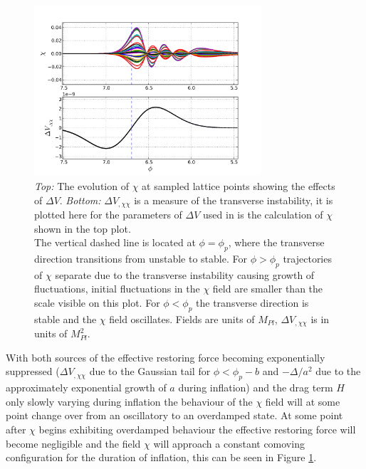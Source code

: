 \documentclass[letterpaper,11pt]{article}
\begin{document}
\begin{figure}
\begin{center}
\includegraphics[width=0.75\textwidth]{chi_deltav_plot1.png}
\caption{\emph{Top:} The evolution of $\chi$ at sampled lattice points showing the effects of $\Delta V$. \emph{Bottom:} $\Delta V_{,\chi \chi}$ is a measure of the transverse instability, it is plotted here for the parameters of $\Delta V$ used in is the calculation of $\chi$ shown in the top plot.\\
The vertical dashed line is located at $\phi=\phi_p$, where the transverse direction transitions from unstable to stable. For $\phi>\phi_p$ trajectories of $\chi$ separate due to the transverse instability causing growth of fluctuations,  initial fluctuations in the $\chi$ field are smaller than the scale visible on this plot. For $\phi<\phi_p$ the transverse direction is stable and the $\chi$ field oscillates. Fields are units of $M_{Pl}$, $\Delta V_{,\chi \chi}$ is in units of $M_{Pl}^2$.}
\label{chi dv plot}
\end{center}
\end{figure}

With both sources of the effective restoring force becoming exponentially suppressed ($\Delta V_{,\chi \chi}$ due to the Gaussian tail for $\phi<\phi_p-b$ and $-\Delta/a^2$ due to the approximately exponential growth of $a$ during inflation) and the drag term $H$ only slowly varying during inflation the behaviour of the $\chi$ field will at some point change over from an oscillatory to an overdamped state. At some point after $\chi$ begins exhibiting overdamped behaviour the effective restoring force will become negligible and the field $\chi$ will approach a constant comoving configuration for the duration of inflation, this can be seen in Figure \ref{chi dv plot}.
\end{document}
